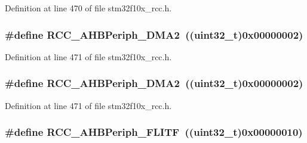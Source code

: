 Definition at line 470 of file stm32f10x\+\_\+rcc.\+h.

\subsubsection[{\texorpdfstring{R\+C\+C\+\_\+\+A\+H\+B\+Periph\+\_\+\+D\+M\+A2}{RCC_AHBPeriph_DMA2}}]{\setlength{\rightskip}{0pt plus 5cm}\#define R\+C\+C\+\_\+\+A\+H\+B\+Periph\+\_\+\+D\+M\+A2~(({\bf uint32\+\_\+t})0x00000002)}\hypertarget{group___a_h_b__peripheral_ga5afb68e40dc0b0f1aa00466e49bc9e70}{}\label{group___a_h_b__peripheral_ga5afb68e40dc0b0f1aa00466e49bc9e70}


Definition at line 471 of file stm32f10x\+\_\+rcc.\+h.

\subsubsection[{\texorpdfstring{R\+C\+C\+\_\+\+A\+H\+B\+Periph\+\_\+\+D\+M\+A2}{RCC_AHBPeriph_DMA2}}]{\setlength{\rightskip}{0pt plus 5cm}\#define R\+C\+C\+\_\+\+A\+H\+B\+Periph\+\_\+\+D\+M\+A2~(({\bf uint32\+\_\+t})0x00000002)}\hypertarget{group___a_h_b__peripheral_ga5afb68e40dc0b0f1aa00466e49bc9e70}{}\label{group___a_h_b__peripheral_ga5afb68e40dc0b0f1aa00466e49bc9e70}


Definition at line 471 of file stm32f10x\+\_\+rcc.\+h.

\subsubsection[{\texorpdfstring{R\+C\+C\+\_\+\+A\+H\+B\+Periph\+\_\+\+F\+L\+I\+TF}{RCC_AHBPeriph_FLITF}}]{\setlength{\rightskip}{0pt plus 5cm}\#define R\+C\+C\+\_\+\+A\+H\+B\+Periph\+\_\+\+F\+L\+I\+TF~(({\bf uint32\+\_\+t})0x00000010)}\hypertarget{group___a_h_b__peripheral_ga4277d70aa6b5e0b1ec6c8fb8180aac08}{}\label{group___a_h_b__peripheral_ga4277d70aa6b5e0b1ec6c8fb8180aac08}


